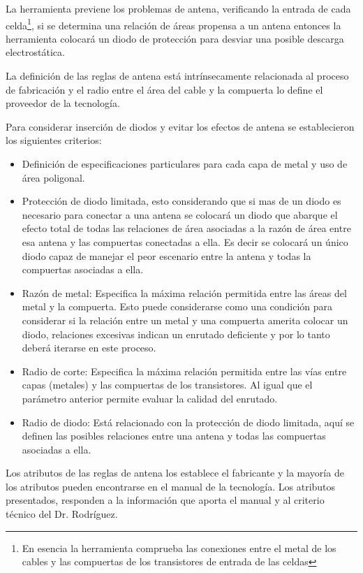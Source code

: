 La herramienta previene los problemas de antena, verificando la entrada de cada celda\footnote{En esencia la herramienta comprueba las conexiones entre el metal de los cables y las compuertas de los transistores de entrada de las celdas}, si se determina una relación  de áreas propensa a un antena entonces la herramienta colocará un diodo de protección para desviar una posible descarga electrostática.

La definición de las reglas de antena está intrínsecamente relacionada al proceso de fabricación y el radio entre el área del cable y la compuerta lo define el proveedor de la tecnología.

Para considerar inserción de diodos y evitar los efectos de antena se establecieron los siguientes criterios:

\begin{itemize}
\item Definición de especificaciones particulares para cada capa de metal y uso de área poligonal.
\item Protección de diodo limitada, esto considerando que si mas de un diodo es necesario para conectar a una antena se colocará un diodo que abarque el efecto total de todas las relaciones de área asociadas a la razón de área entre esa antena y las compuertas conectadas a ella. Es decir se colocará un único diodo capaz de manejar el peor escenario entre la antena y todas la compuertas asociadas a ella.
\item Razón de metal: Especifica la máxima relación permitida entre las áreas del metal y la compuerta. Esto puede considerarse como una condición para considerar si la relación entre un metal y una compuerta amerita colocar un diodo, relaciones excesivas indican un enrutado deficiente y por lo tanto deberá iterarse en este proceso.
\item Radio de corte: Especifica la máxima relación permitida entre las vías entre capas (metales) y las compuertas de los transistores. Al igual que el parámetro anterior permite evaluar la calidad del enrutado.
\item Radio de diodo: Está relacionado con la protección de diodo limitada, aquí se definen las posibles relaciones entre una antena y todas las compuertas asociadas a ella.
\end{itemize}

Los atributos de las reglas de antena los establece el fabricante y la mayoría de los atributos pueden encontrarse en el manual de la tecnología. Los atributos presentados, responden a la información que aporta el manual y al criterio técnico del Dr. Rodríguez.

